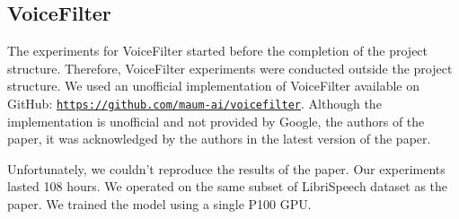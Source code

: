 \subsection{VoiceFilter}
The experiments for VoiceFilter \cite{wang2019voicefilter} started before the completion of the project structure. Therefore, VoiceFilter experiments were conducted outside the project structure. We used an unofficial implementation of VoiceFilter available on GitHub: \texttt{\url{https://github.com/maum-ai/voicefilter}}. Although the implementation is unofficial and not provided by Google, the authors of the paper, it was acknowledged by the authors in the latest version of the paper.

Unfortunately, we couldn't reproduce the results of the paper. Our experiments lasted 108 hours. We operated on the same subset of LibriSpeech dataset \cite{librispeech} as the paper. We trained the model using a single P100 GPU.